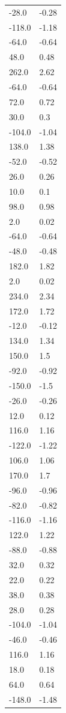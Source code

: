 \begin{longtable}{ll}
-28.0 & -0.28 \\
-118.0 & -1.18 \\
-64.0 & -0.64 \\
48.0 & 0.48 \\
262.0 & 2.62 \\
-64.0 & -0.64 \\
72.0 & 0.72 \\
30.0 & 0.3 \\
-104.0 & -1.04 \\
138.0 & 1.38 \\
-52.0 & -0.52 \\
26.0 & 0.26 \\
10.0 & 0.1 \\
98.0 & 0.98 \\
2.0 & 0.02 \\
-64.0 & -0.64 \\
-48.0 & -0.48 \\
182.0 & 1.82 \\
2.0 & 0.02 \\
234.0 & 2.34 \\
172.0 & 1.72 \\
-12.0 & -0.12 \\
134.0 & 1.34 \\
150.0 & 1.5 \\
-92.0 & -0.92 \\
-150.0 & -1.5 \\
-26.0 & -0.26 \\
12.0 & 0.12 \\
116.0 & 1.16 \\
-122.0 & -1.22 \\
106.0 & 1.06 \\
170.0 & 1.7 \\
-96.0 & -0.96 \\
-82.0 & -0.82 \\
-116.0 & -1.16 \\
122.0 & 1.22 \\
-88.0 & -0.88 \\
32.0 & 0.32 \\
22.0 & 0.22 \\
38.0 & 0.38 \\
28.0 & 0.28 \\
-104.0 & -1.04 \\
-46.0 & -0.46 \\
116.0 & 1.16 \\
18.0 & 0.18 \\
64.0 & 0.64 \\
-148.0 & -1.48 \\

\end{longtable}
